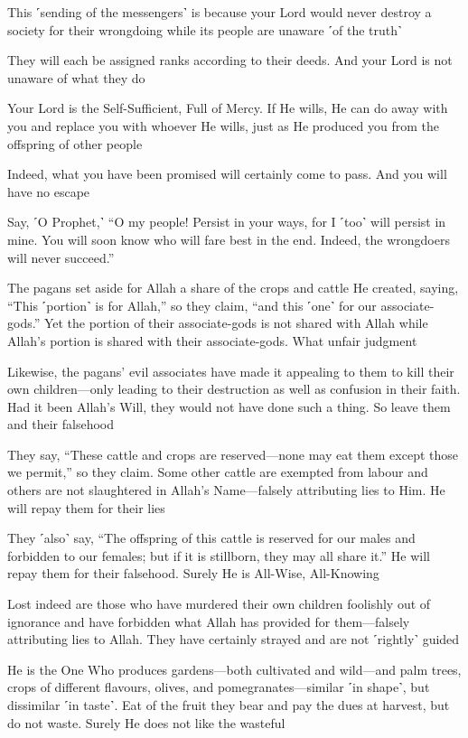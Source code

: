 This ˹sending of the messengers˺ is because your Lord would never destroy a society for their wrongdoing while its people are unaware ˹of the truth˺

They will each be assigned ranks according to their deeds. And your Lord is not unaware of what they do

Your Lord is the Self-Sufficient, Full of Mercy. If He wills, He can do away with you and replace you with whoever He wills, just as He produced you from the offspring of other people

Indeed, what you have been promised will certainly come to pass. And you will have no escape

Say, ˹O Prophet,˺ “O my people! Persist in your ways, for I ˹too˺ will persist in mine. You will soon know who will fare best in the end. Indeed, the wrongdoers will never succeed.”

The pagans set aside for Allah a share of the crops and cattle He created, saying, “This ˹portion˺ is for Allah,” so they claim, “and this ˹one˺ for our associate-gods.” Yet the portion of their associate-gods is not shared with Allah while Allah’s portion is shared with their associate-gods. What unfair judgment

Likewise, the pagans’ evil associates have made it appealing to them to kill their own children—only leading to their destruction as well as confusion in their faith. Had it been Allah’s Will, they would not have done such a thing. So leave them and their falsehood

They say, “These cattle and crops are reserved—none may eat them except those we permit,” so they claim. Some other cattle are exempted from labour and others are not slaughtered in Allah’s Name—falsely attributing lies to Him. He will repay them for their lies

They ˹also˺ say, “The offspring of this cattle is reserved for our males and forbidden to our females; but if it is stillborn, they may all share it.” He will repay them for their falsehood. Surely He is All-Wise, All-Knowing

Lost indeed are those who have murdered their own children foolishly out of ignorance and have forbidden what Allah has provided for them—falsely attributing lies to Allah. They have certainly strayed and are not ˹rightly˺ guided

He is the One Who produces gardens—both cultivated and wild—and palm trees, crops of different flavours, olives, and pomegranates—similar ˹in shape˺, but dissimilar ˹in taste˺. Eat of the fruit they bear and pay the dues at harvest, but do not waste. Surely He does not like the wasteful

